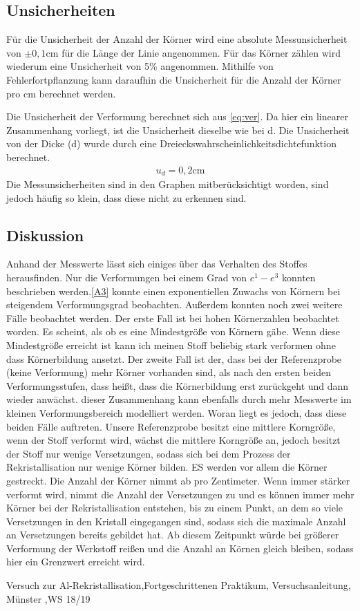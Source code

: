 \documentclass[
	a4paper,
	12pt,
	pagesize,
	ngerman
]{scrartcl}
\begin{document}
\subsection{Unsicherheiten}
Für die Unsicherheit der Anzahl der Körner wird eine absolute Messunsicherheit von $\pm 0,1$cm für die Länge der Linie angenommen. Für das Körner zählen wird wiederum eine Unsicherheit von 5\% angenommen. Mithilfe von Fehlerfortpflanzung kann daraufhin die Unsicherheit für die Anzahl der Körner pro cm berechnet werden.

Die Unsicherheit der Verformung berechnet sich aus \cref{eq:ver}.
Da hier ein linearer Zusammenhang vorliegt, ist die Unsicherheit dieselbe wie bei d. Die Unsicherheit von der Dicke (d) wurde durch eine Dreieckswahrscheinlichkeitsdichtefunktion berechnet.
\begin{align*}
    u_d = 0,2\text{cm}
\end{align*}
Die Messunsicherheiten sind in den Graphen mitberücksichtigt worden, sind jedoch häufig so klein, dass diese nicht zu erkennen sind.


\subsection{Diskussion}
Anhand der Messwerte lässt sich einiges über das Verhalten des Stoffes herausfinden. Nur die Verformungen bei einem Grad von $e^1-e^3$ konnten beschrieben werden.\cref{A3} konnte einen exponentiellen Zuwachs von Körnern bei steigendem Verformungsgrad beobachten. Außerdem konnten noch zwei weitere Fälle beobachtet werden. Der erste Fall ist bei hohen Körnerzahlen beobachtet worden. Es scheint, als ob es eine Mindestgröße von Körnern gäbe. Wenn diese Mindestgröße erreicht ist kann ich meinen Stoff beliebig stark verformen ohne dass Körnerbildung ansetzt. Der zweite Fall ist der, dass bei der Referenzprobe (keine Verformung) mehr Körner vorhanden sind, als nach den ersten beiden Verformungsstufen, dass heißt, dass die Körnerbildung erst zurückgeht und dann wieder anwächst. dieser Zusammenhang kann ebenfalls durch mehr Messwerte im kleinen Verformungsbereich modelliert werden. Woran liegt es jedoch, dass diese beiden Fälle auftreten. Unsere Referenzprobe besitzt eine mittlere Korngröße, wenn der Stoff verformt wird, wächst die mittlere Korngröße an, jedoch besitzt der Stoff nur wenige Versetzungen, sodass sich bei dem Prozess der Rekristallisation nur wenige Körner bilden. ES werden vor allem die Körner gestreckt. Die Anzahl der Körner nimmt ab pro Zentimeter. Wenn immer stärker verformt wird, nimmt die Anzahl der Versetzungen zu und es können immer mehr Körner bei der Rekristallisation entstehen, bis zu einem Punkt, an dem so viele Versetzungen in den Kristall eingegangen sind, sodass sich die maximale Anzahl an Versetzungen bereits gebildet hat. Ab diesem Zeitpunkt würde bei größerer Verformung der Werkstoff reißen und die Anzahl an Körnen gleich bleiben, sodass hier ein Grenzwert erreicht wird.

\newpage

\begin{thebibliography}{9}
	Versuch zur Al-Rekristallisation,Fortgeschrittenen Praktikum, Versuchsanleitung, Münster ,WS 18/19
	
\end{thebibliography}
\end{document}
